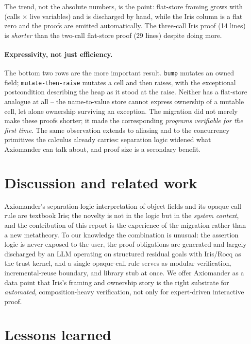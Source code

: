 \documentclass[sigconf,nonacm]{acmart}
\newcommand{\code}[1]{\texttt{#1}}
\begin{document}
The trend, not the absolute numbers, is the point: flat-store framing grows with
(calls $\times$ live variables) and is discharged by hand, while the Iris column
is a flat zero and the proofs are emitted automatically. The three-call Iris
proof (14 lines) is \emph{shorter} than the two-call flat-store proof (29 lines)
despite doing more.

\paragraph{Expressivity, not just efficiency.} The bottom two rows are the more
important result. \code{bump} mutates an owned field; \code{mutate-then-raise}
mutates a cell and then raises, with the exceptional postcondition describing the
heap as it stood at the raise. Neither has a flat-store analogue at all -- the
name-to-value store cannot express ownership of a mutable cell, let alone
ownership surviving an exception. The migration did not merely make these proofs
shorter; it made the corresponding \emph{programs verifiable for the first time}.
The same observation extends to aliasing and to the concurrency primitives the
calculus already carries: separation logic widened what Axiomander can talk
about, and proof size is a secondary benefit.

\section{Discussion and related work}
\label{sec:discussion}

Axiomander's separation-logic interpretation of object fields and its opaque
call rule are textbook Iris; the novelty is not in the logic but in the
\emph{system context}, and the contribution of this report is the experience of
the migration rather than a new metatheory. To our knowledge the combination is
unusual: the assertion logic is never exposed to the user, the proof obligations
are generated and largely discharged by an LLM operating on structured residual
goals with Iris/Rocq as the trust kernel, and a single opaque-call rule serves as
modular verification, incremental-reuse boundary, and library stub at once. We
offer Axiomander as a data point that Iris's framing and ownership story is the
right substrate for \emph{automated}, composition-heavy verification, not only
for expert-driven interactive proof.

\section{Lessons learned}
\label{sec:lessons}
\end{document}
